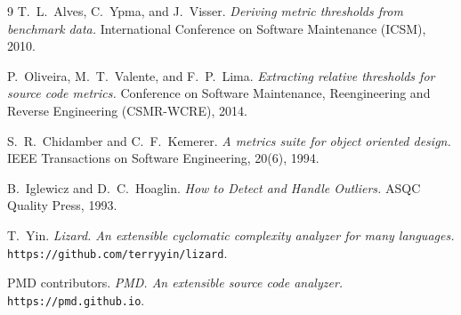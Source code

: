 \documentclass[11pt,a4paper]{article}
\begin{document}
\begin{thebibliography}{9}
T.~L.~Alves, C.~Ypma, and J.~Visser.
\emph{Deriving metric thresholds from benchmark data.}
International Conference on Software Maintenance (ICSM), 2010.

P.~Oliveira, M.~T.~Valente, and F.~P.~Lima.
\emph{Extracting relative thresholds for source code metrics.}
Conference on Software Maintenance, Reengineering and Reverse Engineering
(CSMR-WCRE), 2014.

S.~R.~Chidamber and C.~F.~Kemerer.
\emph{A metrics suite for object oriented design.}
IEEE Transactions on Software Engineering, 20(6), 1994.

B.~Iglewicz and D.~C.~Hoaglin.
\emph{How to Detect and Handle Outliers.}
ASQC Quality Press, 1993.

T.~Yin.
\emph{Lizard. An extensible cyclomatic complexity analyzer for many languages.}
\texttt{https://github.com/terryyin/lizard}.

PMD contributors.
\emph{PMD. An extensible source code analyzer.}
\texttt{https://pmd.github.io}.
\end{thebibliography}
\end{document}
